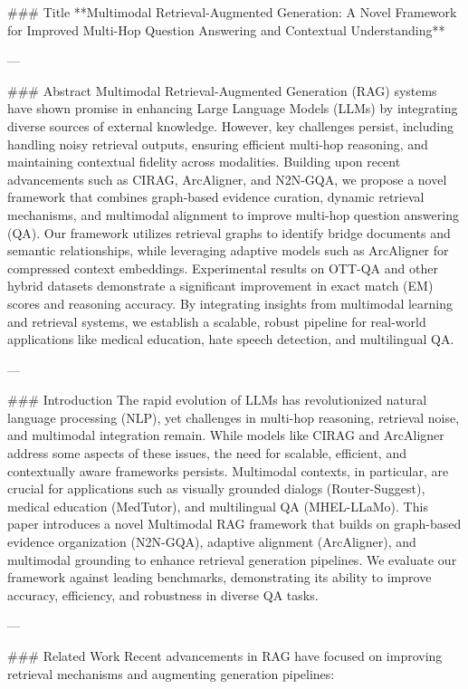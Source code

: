 ### Title  
**Multimodal Retrieval-Augmented Generation: A Novel Framework for Improved Multi-Hop Question Answering and Contextual Understanding**

---

### Abstract  
Multimodal Retrieval-Augmented Generation (RAG) systems have shown promise in enhancing Large Language Models (LLMs) by integrating diverse sources of external knowledge. However, key challenges persist, including handling noisy retrieval outputs, ensuring efficient multi-hop reasoning, and maintaining contextual fidelity across modalities. Building upon recent advancements such as CIRAG, ArcAligner, and N2N-GQA, we propose a novel framework that combines graph-based evidence curation, dynamic retrieval mechanisms, and multimodal alignment to improve multi-hop question answering (QA). Our framework utilizes retrieval graphs to identify bridge documents and semantic relationships, while leveraging adaptive models such as ArcAligner for compressed context embeddings. Experimental results on OTT-QA and other hybrid datasets demonstrate a significant improvement in exact match (EM) scores and reasoning accuracy. By integrating insights from multimodal learning and retrieval systems, we establish a scalable, robust pipeline for real-world applications like medical education, hate speech detection, and multilingual QA.

---

### Introduction  
The rapid evolution of LLMs has revolutionized natural language processing (NLP), yet challenges in multi-hop reasoning, retrieval noise, and multimodal integration remain. While models like CIRAG and ArcAligner address some aspects of these issues, the need for scalable, efficient, and contextually aware frameworks persists. Multimodal contexts, in particular, are crucial for applications such as visually grounded dialogs (Router-Suggest), medical education (MedTutor), and multilingual QA (MHEL-LLaMo). This paper introduces a novel Multimodal RAG framework that builds on graph-based evidence organization (N2N-GQA), adaptive alignment (ArcAligner), and multimodal grounding to enhance retrieval generation pipelines. We evaluate our framework against leading benchmarks, demonstrating its ability to improve accuracy, efficiency, and robustness in diverse QA tasks.

---

### Related Work  
Recent advancements in RAG have focused on improving retrieval mechanisms and augmenting generation pipelines:

